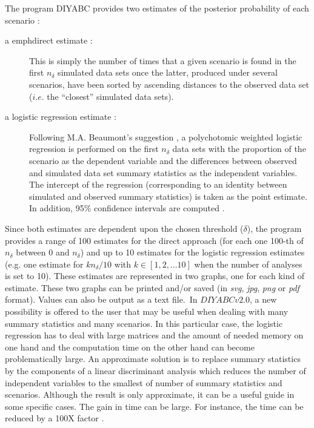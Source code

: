 The program DIYABC provides two estimates of the posterior probability
of each scenario :
\begin{description}
\item [{a emph{direct}  estimate :}] This is simply the number of times
that a given scenario is found in the first $n_{\delta}$ simulated
data sets once the latter, produced under several scenarios, have
been sorted by ascending distances to the observed data set ($i.e.$
the ``closest'' simulated data sets).\\

\item [{a logistic regression estimate :}] Following M.A. Beaumont's suggestion
\citep{FR2007,B2008}, a polychotomic weighted logistic regression
is performed on the first $n_{\delta}$ data sets with the proportion
of the scenario as the dependent variable and the differences between
observed and simulated data set summary statistics as the independent
variables. The intercept of the regression (corresponding to an identity
between simulated and observed summary statistics) is taken as the
point estimate. In addition, 95\% confidence intervals are computed
\citep{C2008}.
\end{description}
Since both estimates are dependent upon the chosen threshold ($\delta$),
the program provides a range of 100 estimates for the direct approach
(for each one 100-th of $n_{\delta}$ between 0 and $n_{\delta}$)
and up to 10 estimates for the logistic regression estimates (e.g.
one estimate for $kn_{\delta}/10$ with $k\in[1,2,...10]$ when the
number of analyses is set to 10). These estimates are represented
in two graphs, one for each kind of estimate. These two graphs can
be printed and/or saved (in \emph{svg}, \emph{jpg}, \emph{png} or
\emph{pdf} format). Values can also be output as a text file.\
 In $DIYABCv2.0$, a new possibility is offered to the user that may
be useful when dealing with many summary statistics and many scenarios.
In this particular case, the logistic regression has to deal with
large matrices and the amount of needed memory on one hand and the
computation time on the other hand can become problematically large.
An approximate solution is to replace summary statistics by the components
of a linear discriminant analysis which reduces the number of independent
variables to the smallest of number of summary statistics and scenarios.
Although the result is only approximate, it can be a useful guide
in some specific cases. The gain in time can be large. For instance,
the time can be reduced by a 100X factor \citep{EL2012}. \\



